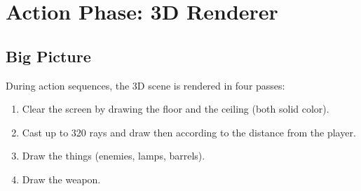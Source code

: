 \section{Action Phase: 3D Renderer}


\subsection{Big Picture}

During action sequences, the 3D scene is rendered in four passes:
\begin{enumerate}
 \item Clear the screen by drawing the floor and the ceiling (both solid color).
 \item Cast up to 320 rays and draw then according to the distance from the player.
 \item Draw the things (enemies, lamps, barrels).
 \item Draw the weapon.	
\end{enumerate}


